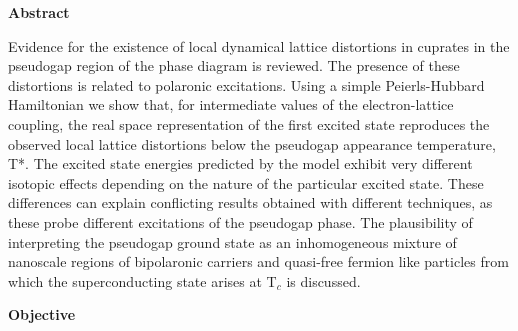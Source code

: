 
\cleardoublepage
{}
{}
\begin{center}
\textbf{\large Abstract}
\end{center}
Evidence for the existence of local dynamical lattice distortions in cuprates in the pseudogap region of the phase diagram is reviewed. The presence of these distortions is related to polaronic excitations. Using a simple Peierls-Hubbard Hamiltonian we show that, for intermediate values of the electron-lattice coupling, the real space representation of the first excited state reproduces the observed local lattice distortions below the pseudogap appearance temperature, T*. The excited state energies predicted by the model exhibit very different isotopic effects depending on the nature of the particular excited state. These differences can explain conflicting results obtained with different techniques, as these probe different excitations of the pseudogap phase. The plausibility of interpreting the pseudogap ground state as an inhomogeneous mixture of nanoscale regions of bipolaronic carriers and quasi-free fermion like particles from which the superconducting state arises at T$_c$ is discussed.


\cleardoublepage
{}
{}
\begin{center}
\textbf{\large Objective}
\end{center}
